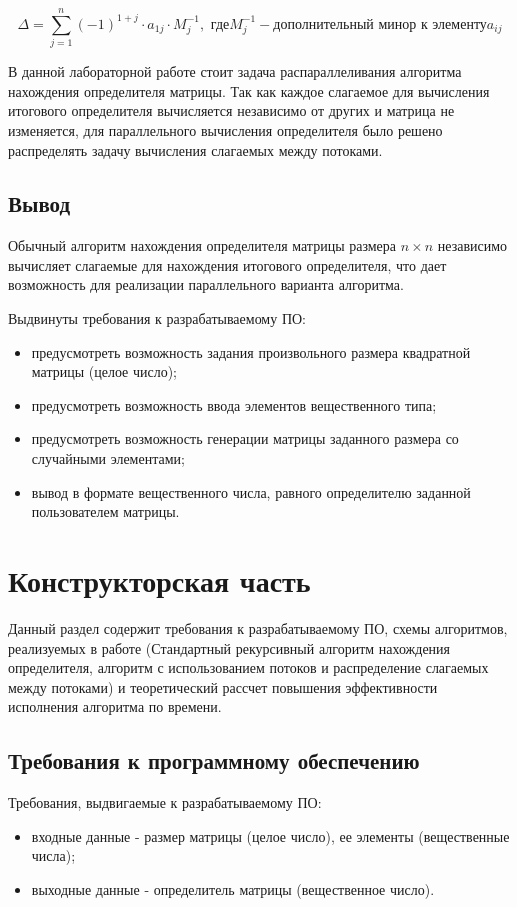 \documentclass[12pt]{report}
\begin{document}
    \begin{equation}
        \label{eq:det_nxn}
        \Delta =
        \sum\limits_{j = 1}^{n} (-1)^{1 + j} \cdot a_{1j} \cdot M_{j}^{-1}
        , \text{ где} M_{j}^{-1} - \text{дополнительный минор к элементу} a_{ij}
    \end{equation}

    В данной лабораторной работе стоит задача распараллеливания алгоритма нахождения определителя матрицы.
    Так как каждое слагаемое для вычисления итогового определителя
    вычисляется независимо от других и матрица не изменяется, для параллельного вычисления определителя
    было решено распределять задачу вычисления слагаемых между потоками.


    \section{Вывод}
    Обычный алгоритм нахождения определителя матрицы размера $n \times n$ независимо вычисляет слагаемые
    для нахождения итогового определителя, что дает возможность для реализации параллельного варианта алгоритма.
    
    Выдвинуты требования к разрабатываемому ПО:
    \begin{itemize}
    	\item предусмотреть возможность задания произвольного размера квадратной матрицы (целое число);
    	\item предусмотреть возможность ввода элементов вещественного типа;
    	\item предусмотреть возможность генерации матрицы заданного размера со случайными элементами;
    	\item вывод в формате вещественного числа, равного определителю заданной пользователем матрицы.
    \end{itemize}
    
    \newpage


    \chapter{Конструкторская часть}
    Данный раздел содержит требования к разрабатываемому ПО,
    схемы алгоритмов, реализуемых в работе
    (Стандартный рекурсивный алгоритм нахождения определителя,
    алгоритм с использованием потоков и распределение слагаемых между потоками)
    и теоретический рассчет повышения эффективности исполнения алгоритма по времени.


    \section{Требования к программному обеспечению}
    Требования, выдвигаемые к разрабатываемому ПО:
    \begin{itemize}
        \item входные данные - размер матрицы (целое число), ее элементы (вещественные числа);
        \item выходные данные - определитель матрицы (вещественное число).
    \end{itemize}
\end{document}
